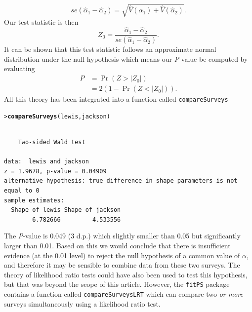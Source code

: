 \documentclass{article}\usepackage[]{graphicx}\usepackage[]{xcolor}
\makeatletter
\newcommand{\hlstd}[1]{\textcolor[rgb]{0.345,0.345,0.345}{#1}}%
\newcommand{\hlkwd}[1]{\textcolor[rgb]{0.737,0.353,0.396}{\textbf{#1}}}%
\newenvironment{kframe}{%
 \def\at@end@of@kframe{}%
 \ifinner\ifhmode%
  \def\at@end@of@kframe{\end{minipage}}%
  \begin{minipage}{\columnwidth}%
 \fi\fi%
 \def\FrameCommand##1{\hskip\@totalleftmargin \hskip-\fboxsep
 \colorbox{shadecolor}{##1}\hskip-\fboxsep
     \hskip-\linewidth \hskip-\@totalleftmargin \hskip\columnwidth}%
 \MakeFramed {\advance\hsize-\width
   \@totalleftmargin\z@ \linewidth\hsize
   \@setminipage}}%
 {\par\unskip\endMakeFramed%
 \at@end@of@kframe}
\newenvironment{knitrout}{}{} %
\newcommand{\rcode}[1]{\lstinline[language=R,basicstyle=\normalsize\ttfamily]!#1!}
\makeatother
\begin{document}
\[
se(\hat{\alpha}_{1}-\hat{\alpha}_{2}) = \sqrt{\hat{V}(\hat{\alpha}_1)+\hat{V}(\hat{\alpha}_2)}.
\]
Our test statistic is then
\[
Z_0 = \frac{\hat{\alpha}_{1}-\hat{\alpha}_{2}}{se(\hat{\alpha}_{1}-\hat{\alpha}_{2})}.
\]
It can be shown that this test statistic follows an approximate normal distribution under the null hypothesis which means our \emph{P}-value be computed by evaluating
\begin{align*}
P&=\Pr(Z > |Z_0|) \\
&=2(1 - \Pr(Z < |Z_0|)).
\end{align*}
All this theory has been integrated into a function called \rcode{compareSurveys}
\begin{knitrout}
\color{fgcolor}\begin{kframe}
\begin{alltt}
\hlstd{> }\hlkwd{compareSurveys}\hlstd{(lewis, jackson)}
\end{alltt}
\begin{verbatim}

	Two-sided Wald test

data:  lewis and jackson
z = 1.9678, p-value = 0.04909
alternative hypothesis: true difference in shape parameters is not equal to 0
sample estimates:
  Shape of lewis Shape of jackson 
        6.782666         4.533556 
\end{verbatim}
\end{kframe}
\end{knitrout}\noindent
The \emph{P}-value is 0.049 (3 d.p.) which slightly smaller than 0.05 but significantly larger than 0.01. Based on this we would conclude that there is insufficient evidence (at the 0.01 level) to reject the null hypothesis of a common value of $\alpha$, and therefore it may be sensible to combine data from these two surveys. The theory of likelihood ratio tests \citep{wiki:lrt} could have also been used to test this hypothesis, but that was beyond the scope of this article. However, the \rcode{fitPS} package contains a function called \rcode{compareSurveysLRT} which can compare two \emph{or more} surveys simultaneously using a likelihood ratio test.
\end{document}
